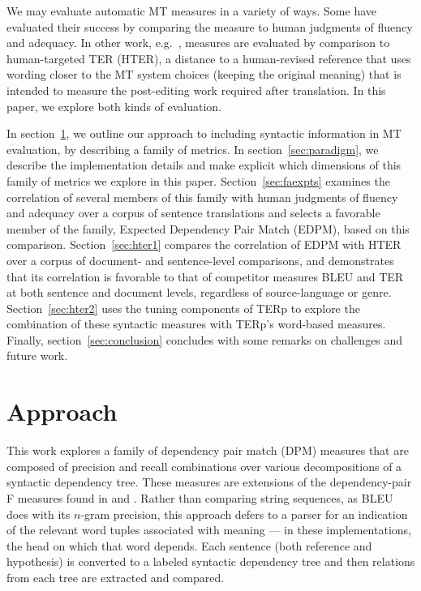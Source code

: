 \documentclass{kluwer}    %
\begin{document}
\begin{article}
We may evaluate automatic MT measures in a variety of ways. Some
\cite{banerjee05meteor,liu05syntaxformteval,owczarzak07labelleddepseval}
have evaluated their success by comparing the measure to human
judgments of fluency and adequacy.  In other work, e.g.\
, measures are evaluated by comparison to
human-targeted TER (HTER), a distance to a human-revised reference
that uses wording closer to the MT system choices (keeping the
original meaning) that is intended to measure the post-editing work
required after translation.  In this paper, we explore both kinds of
evaluation.

In section~\ref{sec:approach}, we outline our approach to including
syntactic information in MT evaluation, by describing a family of
metrics. In section~\ref{sec:paradigm}, we describe the implementation
details and make explicit which dimensions of this family of metrics
we explore in this paper.  Section~\ref{sec:faexpts} examines the
correlation of several members of this family with human judgments of
fluency and adequacy over a corpus of sentence translations and
selects a favorable member of the family, Expected Dependency Pair
Match (EDPM), based on this comparison. Section~\ref{sec:hter1}
compares the correlation of EDPM with HTER over a corpus of document-
and sentence-level comparisons, and demonstrates that its correlation
is favorable to that of competitor measures BLEU and TER at both
sentence and document levels, regardless of source-language or genre.
Section~\ref{sec:hter2} uses the tuning components of TERp
to explore the combination of these syntactic measures with TERp's
word-based measures. Finally, section~\ref{sec:conclusion} concludes
with some remarks on challenges and future work.

\section{Approach}
\label{sec:approach}

This work explores a family of dependency pair match (DPM) measures
that are composed of precision and recall combinations over various
decompositions of a syntactic dependency tree. These measures are
extensions of the dependency-pair F measures found in
 and
.  Rather than comparing
string sequences, as BLEU does with its $n$-gram precision, this
approach defers to a parser for an indication of the relevant word
tuples associated with meaning --- in these implementations, the head
on which that word depends.  Each sentence (both reference and
hypothesis) is converted to a labeled syntactic dependency tree and
then relations from each tree are extracted and compared.


\end{article}
\end{document}
